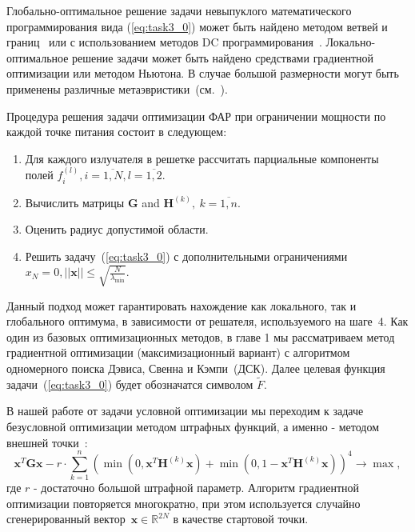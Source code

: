 Глобально-оптимальное решение задачи невыпуклого математического программирования вида (\ref{eq:task3_0}) может быть найдено методом
ветвей и границ~ или с использованием методов DC программирования~. Локально-оптимальное решение задачи может быть найдено средствами градиентной оптимизации или методом Ньютона. В случае большой размерности могут быть применены различные метаэвристики~(см.~).

Процедура решения задачи оптимизации ФАР при ограничении мощности по каждой точке питания состоит в следующем:
%
\begin{enumerate}
  \item Для каждого излучателя в решетке рассчитать парциальные компоненты полей $f_i^{(l)}, i= \overline{1,N}, l=\overline{1,2}$.
  \item Вычислить матрицы $\textbf{G}$ and ${\textbf{H}}^{(k)},\ k=\overline{1,n}$.
  \item Оценить радиус допустимой области.
  \item Решить задачу~(\ref{eq:task3_0}) с дополнительными ограничениями $x_N = 0, ||\textbf{x}||\le \sqrt{\frac{N}{\lambda_{\min}}}$.
\end{enumerate}

Данный подход может гарантировать нахождение как локального, так и глобального оптимума, в зависимости от решателя, используемого на шаге~4. Как один из базовых оптимизационных методов, в главе 1 мы рассматриваем метод градиентной оптимизации (максимизационный вариант)
с алгоритмом одномерного поиска Дэвиса, Свенна и Кэмпи~(ДСК). Далее целевая функция задачи~(\ref{eq:task3_0}) будет обозначатся символом $\tilde{F}$.

В нашей работе от задачи условной оптимизации мы переходим к задаче безусловной оптимизации методом штрафных функций, а именно -
методом внешней точки~:
\begin{equation}
       \textbf{x}^{T}\textbf{Gx} - r\cdot \sum_{k=1}^n
       \left( \min\left(0,\textbf{x}^{T}\textbf{H}^{(k)}\textbf{x}\right) +
       \min\left(0,1-\textbf{x}^{T}\textbf{H}^{(k)}\textbf{x}\right)\right)^4 \rightarrow
       \max,
     \label{eq:task4}
\end{equation}
где $r$ - достаточно большой штрафной параметр. Алгоритм градиентной оптимизации повторяется многократно, при этом используется случайно сгенерированный вектор~$\textbf{x}\in \mathbb{R}^{2N}$ в качестве стартовой точки.

